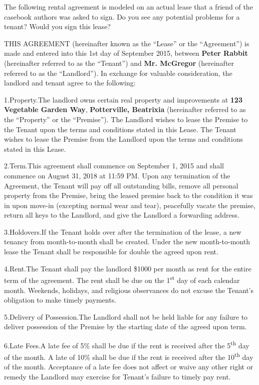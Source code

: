 The following rental agreement is modeled on an actual lease that a friend of
the casebook authors was asked to sign.  Do you see any potential problems for
a tenant?  Would you sign this lease?


THIS AGREEMENT (hereinafter known as the ``Lease'' or the ``Agreement'') is made
and entered into this 1st day of September 2015, between
\textbf{Peter Rabbit} (hereinafter referred to as the ``Tenant'') and
\textbf{Mr. McGregor} (hereinafter referred to as the ``Landlord'').  In
exchange for valuable consideration, the landlord and tenant agree to the
following:

1.\quad Property.\quad The landlord owns certain real property and improvements
at \textbf{123 Vegetable Garden Way}, \textbf{Potterville, Beatrixia}
(hereinafter referred to as the ``Property'' or the ``Premise'').  The Landlord
wishes to lease the Premise to the Tenant upon the terms and conditions stated
in this Lease.  The Tenant wishes to lease the Premise from the Landlord upon
the terms and conditions stated in this Lease.

2.\quad Term.\quad This agreement shall commence on September 1, 2015 and shall
commence on August 31, 2018 at 11:59 PM.  Upon any termination of the Agreement,
the Tenant will pay off all outstanding bills, remove all personal property from
the Premise, bring the leased premise back to the condition it was in upon
move-in (excepting normal wear and tear), peacefully vacate the premise, return
all keys to the Landlord, and give the Landlord a forwarding address.  

3.\quad Holdovers.\quad If the Tenant holds over after the termination of the lease, a
new tenancy from month-to-month shall be created.  Under the new month-to-month
lease the Tenant shall be responsible for double the agreed upon rent.  

4.\quad Rent.\quad The Tenant shall pay the landlord \$1000 per month as rent for the
entire term of the agreement.  The rent shall be due on the
1\textsuperscript{st} day of each calendar month.  Weekends, holidays, and
religious observances do not excuse the Tenant's obligation to make timely
payments.

5.\quad Delivery of Possession.\quad The Landlord shall not be held liable for any
failure to deliver possession of the Premise by the starting date of the agreed
upon term.

6.\quad Late Fees.\quad A late fee of 5\% shall be due if the rent is received after the
5\textsuperscript{th} day of the month.  A late of 10\% shall be due if the
rent is received after the 10\textsuperscript{th} day of the month.  Acceptance
of a late fee does not affect or waive any other right or remedy the Landlord
may exercise for Tenant's failure to timely pay rent.  

